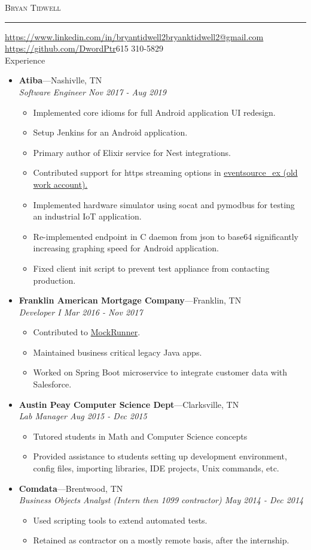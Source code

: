 \documentclass[11pt,oneside]{article}
\makeatletter
\newcommand{\name}{Bryan Tidwell}
\newcommand{\email}{\href{mailto:bryanktidwell2@gmail.com}{bryanktidwell2@gmail.com}}
\newcommand{\github}{\url{https://github.com/DwordPtr}}
\newcommand{\linkedin}{\url{https://www.linkedin.com/in/bryantidwell2}}
\newcommand{\bigname}[1]{
	\begin{center}\fontfamily{phv}\selectfont\LARGE\scshape#1\end{center}
}
\newenvironment{ressection}[1]{
	\vspace{4pt}
	{\fontfamily{phv}\selectfont\Large#1}
	\begin{itemize}
	\vspace{3pt}
}{
	\end{itemize}
}
\newcommand{\ressubitem}[1]{
	\vspace{-1pt}
	\item \begin{flushleft} #1 \end{flushleft}
}
\newcommand{\resbigitem}[3]{
	\vspace{-5pt}
	\item
	\textbf{#1}---#2 \\
	\textit{#3}
}
\newenvironment{ressubsec}[3]{
	\resbigitem{#1}{#2}{#3}
	\vspace{-2pt}
	\begin{itemize}
}{
	\end{itemize}
}
\makeatother
\begin{document}
 \selectfont

\bigname{\name}

\vspace{-8pt} \rule{\textwidth}{1pt}

\vspace{-1pt} {\small \linkedin \small \hfill \email} \\
\vspace{-1pt} {\small \github \small \hfill 615 310-5829} \\

\begin{ressection}{Experience}
        \begin{ressubsec}{Atiba}{Nashivlle, TN}{Software Engineer Nov 2017 - Aug 2019}
		\ressubitem{Implemented core idioms for full Android application UI redesign.}
		\ressubitem{Setup Jenkins for an Android application.}
		\ressubitem{Primary author of Elixir service for Nest integrations.}
        \ressubitem{Contributed support for https streaming options in \href{https://github.com/cwc/eventsource_ex/pull/10/files}{eventsource\_ex (old work account).}}
        \ressubitem{Implemented hardware simulator using socat and pymodbus for testing an industrial IoT application.}
        \ressubitem{Re-implemented endpoint in C daemon from json to base64 significantly increasing graphing speed for Android application.}
		\ressubitem{Fixed client init script to prevent test appliance from contacting production.}
	\end{ressubsec}

			\begin{ressubsec}{Franklin American Mortgage Company}{Franklin, TN}{Developer I Mar 2016 - Nov 2017}
                    \ressubitem{Contributed to \href{https://github.com/mockrunner/mockrunner/pull/42}{MockRunner}.}
		\ressubitem{Maintained business critical legacy Java apps.}
		\ressubitem{Worked on Spring Boot microservice to integrate customer data with Salesforce.}
	\end{ressubsec}


	\begin{ressubsec}{Austin Peay Computer Science Dept}{Clarksville, TN}{Lab Manager Aug 2015 - Dec 2015}
		\ressubitem{Tutored students in Math and Computer Science concepts}
		\ressubitem{Provided assistance to students setting up development environment, config files, importing libraries, IDE projects, Unix commands, etc.}
	\end{ressubsec}

	\begin{ressubsec}{Comdata}{Brentwood, TN}{Business Objects Analyst (Intern then 1099 contractor) May 2014 - Dec 2014}
    \ressubitem{Used scripting tools to extend automated tests.}
    \ressubitem{Retained as contractor on a mostly remote basis, after the internship.}
	\end{ressubsec}

\end{ressection}
\end{document}
